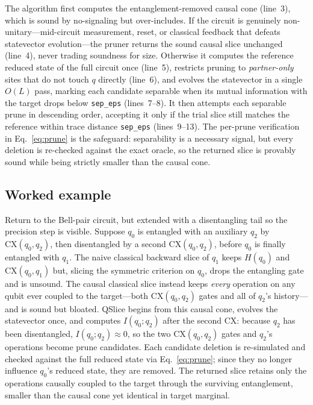 \documentclass[10pt,conference]{IEEEtran}
\theoremstyle{definition}
\begin{document}
The algorithm first computes the entanglement-removed causal cone (line~3), which is sound by no-signaling but over-includes. If the circuit is genuinely non-unitary---mid-circuit measurement, reset, or classical feedback that defeats statevector evolution---the pruner returns the sound causal slice unchanged (line~4), never trading soundness for size. Otherwise it computes the reference reduced state of the full circuit once (line~5), restricts pruning to \emph{partner-only} sites that do not touch $q$ directly (line~6), and evolves the statevector in a single $O(L)$ pass, marking each candidate separable when its mutual information with the target drops below \texttt{sep\_eps} (lines~7--8). It then attempts each separable prune in descending order, accepting it only if the trial slice still matches the reference within trace distance \texttt{sep\_eps} (lines~9--13). The per-prune verification in Eq.~\eqref{eq:prune} is the safeguard: separability is a necessary signal, but every deletion is re-checked against the exact oracle, so the returned slice is provably sound while being strictly smaller than the causal cone.

\subsection{Worked example}
Return to the Bell-pair circuit, but extended with a disentangling tail so the precision step is visible. Suppose $q_0$ is entangled with an auxiliary $q_2$ by $\mathrm{CX}(q_0,q_2)$, then disentangled by a second $\mathrm{CX}(q_0,q_2)$, before $q_0$ is finally entangled with $q_1$. The naive classical backward slice of $q_1$ keeps $H(q_0)$ and $\mathrm{CX}(q_0,q_1)$ but, slicing the symmetric criterion on $q_0$, drops the entangling gate and is unsound. The causal classical slice instead keeps \emph{every} operation on any qubit ever coupled to the target---both $\mathrm{CX}(q_0,q_2)$ gates and all of $q_2$'s history---and is sound but bloated. QSlice begins from this causal cone, evolves the statevector once, and computes $I(q_0;q_2)$ after the second $\mathrm{CX}$: because $q_2$ has been disentangled, $I(q_0;q_2)\!\approx\!0$, so the two $\mathrm{CX}(q_0,q_2)$ gates and $q_2$'s operations become prune candidates. Each candidate deletion is re-simulated and checked against the full reduced state via Eq.~\eqref{eq:prune}; since they no longer influence $q_0$'s reduced state, they are removed. The returned slice retains only the operations causally coupled to the target through the surviving entanglement, smaller than the causal cone yet identical in target marginal.
\end{document}
